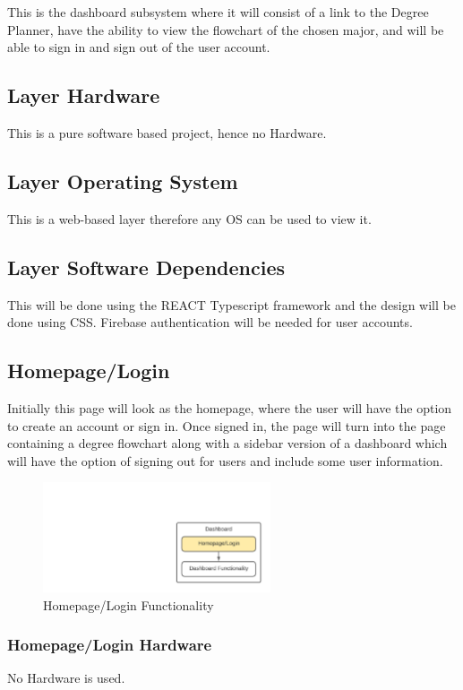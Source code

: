 This is the dashboard subsystem where it will consist of a link to the Degree Planner, have the ability to view the flowchart of the chosen major, and will be able to sign in and sign out of the user account. 

\subsection{Layer Hardware}
This is a pure software based project, hence no Hardware.

\subsection{Layer Operating System}
This is a web-based layer therefore any OS can be used to view it.

\subsection{Layer Software Dependencies}
This will be done using the REACT Typescript framework and the design will be done using CSS. Firebase authentication will be needed for user accounts.

\subsection{Homepage/Login}
Initially this page will look as the homepage, where the user will have the option to create an account or sign in. Once signed in, the page will turn into the page containing a degree flowchart along with a sidebar version of a dashboard which will have the option of signing out for users and include some user information.

\begin{figure}[h!]
	\centering
 	\includegraphics[width=0.60\textwidth]{images/Dashboard_Pic1} %
 \caption{Homepage/Login Functionality} %
\end{figure}

\subsubsection{Homepage/Login Hardware}
No Hardware is used.

